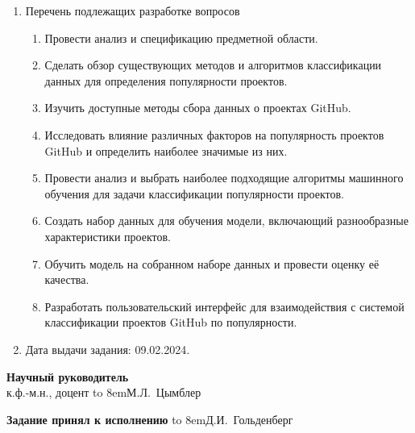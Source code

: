 \begin{adjustwidth}{-1.5cm}{0.5cm}
\begin{linespread}{1}
{\begin{enumerate}
	\bf\item Перечень подлежащих разработке вопросов\rm
	\begin{enumerate}
		\item Провести анализ и спецификацию предметной области.
        \item Сделать обзор существующих методов и алгоритмов классификации данных для определения популярности проектов.
        \item Изучить доступные методы сбора данных о проектах GitHub.
        \item Исследовать влияние различных факторов на популярность проектов GitHub и определить наиболее значимые из них.
        \item Провести анализ и выбрать наиболее подходящие алгоритмы машинного обучения для задачи классификации популярности проектов.
        \item Создать набор данных для обучения модели, включающий разнообразные характеристики проектов.
        \item Обучить модель на собранном наборе данных и провести оценку её качества.
        \item Разработать пользовательский интерфейс для взаимодействия с системой классификации проектов GitHub по популярности.
	\end{enumerate}

	\bf\item Дата выдачи задания: \rm
	09.02.2024.
\end{enumerate}

\vspace{1em}

\noindent
\textbf{Научный руководитель}\\[0.5em]
к.ф.-м.н., доцент
\hfill
\hbox to 8em{М.Л.~Цымблер\hfill}

\vspace{1em}

\noindent
\textbf{Задание принял к исполнению}
\hfill
\hbox to 8em{Д.И.~Гольденберг\hfill}

}

\thispagestyle{empty}

\end{linespread}
\end{adjustwidth}

\pagebreak
